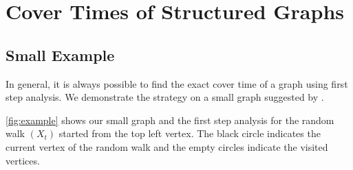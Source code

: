 \documentclass[12pt]{article}
\theoremstyle{definition}
\begin{document}
\section{Cover Times of Structured Graphs}\label{sec:structured_graphs}

\subsection{Small Example}\label{sec:small_example}
In general, it is always possible to find the exact cover time
of a graph using first step analysis.
We demonstrate the strategy on a small graph suggested by \cite{BH94}.

\cref{fig:example} shows our small graph and the first step analysis
for the random walk $(X_t)$ started from the top left vertex.
The black circle indicates the current vertex of the random walk
and the empty circles indicate the visited vertices.
\end{document}
